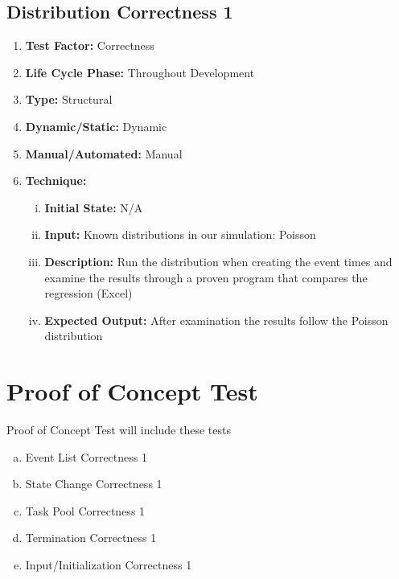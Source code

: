 \documentclass[paper=letter, fontsize=10pt]{scrartcl}
\numberwithin{equation}{section}		%
\numberwithin{figure}{section}			%
\numberwithin{table}{section}				%
\begin{document}
\subsection{Distribution Correctness 1}
\begin{enumerate}[]
	\item \textbf{Test Factor:} Correctness 
	\item \textbf{Life Cycle Phase:} Throughout Development
	\item \textbf{Type:} Structural
	\item \textbf{Dynamic/Static:} Dynamic
	\item \textbf{Manual/Automated:} Manual
	\item \textbf{Technique:}
		\begin{enumerate}[(i)]
			\item \textbf{Initial State:} N/A  
			\item \textbf{Input:} Known distributions in our simulation: Poisson
			\item \textbf{Description:} Run the distribution when creating the event times and examine the results through a proven program that compares the regression (Excel)
			\item \textbf{Expected Output:} After examination the results follow the Poisson distribution
		\end{enumerate}
\end{enumerate}

\section{Proof of Concept Test}
Proof of Concept Test will include these tests
\begin{enumerate}[(a)]
	\item Event List Correctness 1
	\item State Change Correctness 1
	\item Task Pool Correctness 1
	\item Termination Correctness 1
	\item Input/Initialization Correctness 1
\end{enumerate}
\end{document}
